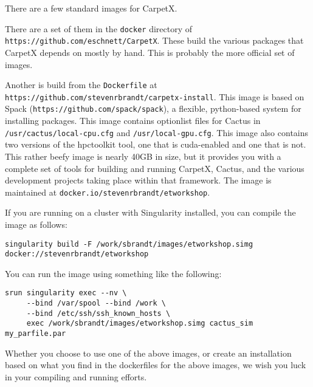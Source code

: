 There are a few standard images for CarpetX.

There are a set of them in the \texttt{docker} directory of \texttt{https://github.com/eschnett/CarpetX}. These build the various packages that CarpetX depends on mostly by hand. This is probably the more official set of images.

Another is build from the \texttt{Dockerfile} at \texttt{https://github.com/stevenrbrandt/carpetx-install}. This image is based on Spack (\texttt{https://github.com/spack/spack}), a flexible, python-based system for installing packages. This image contains optionlist files for Cactus in \texttt{/usr/cactus/local-cpu.cfg} and \texttt{/usr/local-gpu.cfg}. This image also contains two versions of the hpctoolkit tool, one that is cuda-enabled and one that is not. This rather beefy image is nearly 40GB in size, but it provides you with a complete set of tools for building and running CarpetX, Cactus, and the various development projects taking place within that framework. The image is maintained at \texttt{docker.io/stevenrbrandt/etworkshop}.

If you are running on a cluster with Singularity installed, you can compile the image as follows:

\begin{lstlisting}
singularity build -F /work/sbrandt/images/etworkshop.simg docker://stevenrbrandt/etworkshop
\end{lstlisting}

You can run the image using something like the following:
\begin{lstlisting}
srun singularity exec --nv \
     --bind /var/spool --bind /work \
     --bind /etc/ssh/ssh_known_hosts \
     exec /work/sbrandt/images/etworkshop.simg cactus_sim my_parfile.par
\end{lstlisting}

Whether you choose to use one of the above images, or create an installation based on what you find in the dockerfiles for the above images, we wish you luck in your compiling and running efforts.
